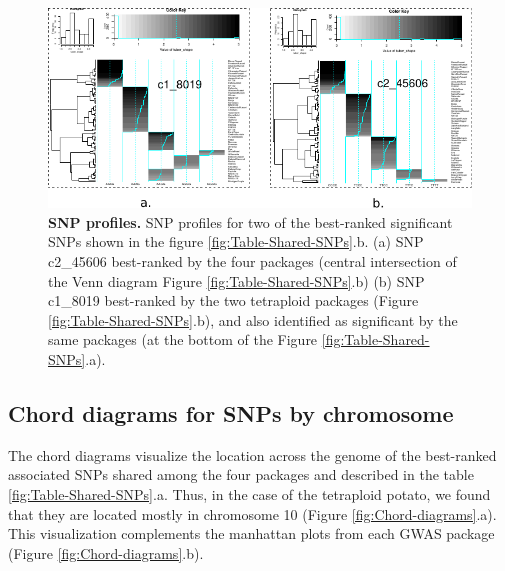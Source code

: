 \documentclass{article}
\begin{document}
\begin{figure}[H]
\begin{centering}
\includegraphics{images/paper-heat-maps}
\par\end{centering}
\caption{\textbf{\scriptsize{}SNP profiles. }{\scriptsize{}SNP profiles for
two of the best-ranked significant SNPs shown in the figure \ref{fig:Table-Shared-SNPs}.b.
(a) SNP c2\_45606 best-ranked by the four packages (central intersection
of the Venn diagram Figure \ref{fig:Table-Shared-SNPs}.b) (b) SNP
c1\_8019 best-ranked by the two tetraploid packages (Figure \ref{fig:Table-Shared-SNPs}.b),
and also identified as significant by the same packages (at the bottom
of the Figure \ref{fig:Table-Shared-SNPs}.a). \label{fig:SNP-profiles}}}
\end{figure}

\subsection{Chord diagrams for SNPs by chromosome}
The chord diagrams visualize the location across the genome of the best-ranked associated SNPs shared among the four packages and described in the table \ref{fig:Table-Shared-SNPs}.a.  Thus, in the case of the tetraploid potato, we found that they are located mostly in chromosome 10  (Figure \ref{fig:Chord-diagrams}.a). This visualization complements the manhattan plots from each GWAS package (Figure \ref{fig:Chord-diagrams}.b).
\end{document}
